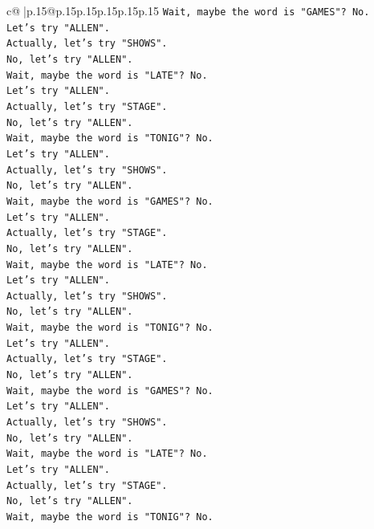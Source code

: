 \documentclass{article}
\begin{document}
{\begin{supertabular}{c@{$\;$}|p{.15\linewidth}@{}p{.15\linewidth}p{.15\linewidth}p{.15\linewidth}p{.15\linewidth}p{.15\linewidth}}
{{{\texttt{Wait, maybe the word is "GAMES"? No.} \\
\texttt{Let's try "ALLEN".} \\
\texttt{Actually, let's try "SHOWS".} \\
\texttt{No, let's try "ALLEN".} \\
\texttt{Wait, maybe the word is "LATE"? No.} \\
\texttt{Let's try "ALLEN".} \\
\texttt{Actually, let's try "STAGE".} \\
\texttt{No, let's try "ALLEN".} \\
\texttt{Wait, maybe the word is "TONIG"? No.} \\
\texttt{Let's try "ALLEN".} \\
\texttt{Actually, let's try "SHOWS".} \\
\texttt{No, let's try "ALLEN".} \\
\texttt{Wait, maybe the word is "GAMES"? No.} \\
\texttt{Let's try "ALLEN".} \\
\texttt{Actually, let's try "STAGE".} \\
\texttt{No, let's try "ALLEN".} \\
\texttt{Wait, maybe the word is "LATE"? No.} \\
\texttt{Let's try "ALLEN".} \\
\texttt{Actually, let's try "SHOWS".} \\
\texttt{No, let's try "ALLEN".} \\
\texttt{Wait, maybe the word is "TONIG"? No.} \\
\texttt{Let's try "ALLEN".} \\
\texttt{Actually, let's try "STAGE".} \\
\texttt{No, let's try "ALLEN".} \\
\texttt{Wait, maybe the word is "GAMES"? No.} \\
\texttt{Let's try "ALLEN".} \\
\texttt{Actually, let's try "SHOWS".} \\
\texttt{No, let's try "ALLEN".} \\
\texttt{Wait, maybe the word is "LATE"? No.} \\
\texttt{Let's try "ALLEN".} \\
\texttt{Actually, let's try "STAGE".} \\
\texttt{No, let's try "ALLEN".} \\
\texttt{Wait, maybe the word is "TONIG"? No.} \\
}}}
\end{supertabular}}
\end{document}
